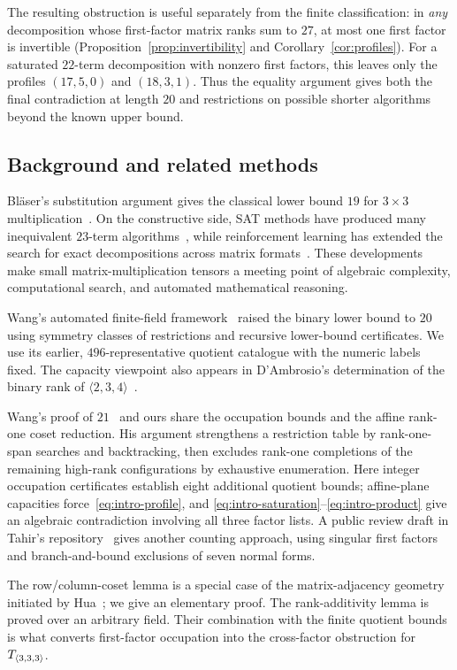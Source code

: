 The resulting obstruction is useful separately from the finite
classification: in \emph{any} decomposition whose first-factor matrix
ranks sum to $27$, at most one first factor is invertible
(Proposition~\ref{prop:invertibility} and
Corollary~\ref{cor:profiles}). For a saturated $22$-term
decomposition with nonzero first factors, this leaves only the profiles
$(17,5,0)$ and $(18,3,1)$. Thus the equality argument gives both the
final contradiction at length $20$ and restrictions on possible shorter
algorithms beyond the known upper bound.

\subsection{Background and related methods}
Bl\"aser's substitution argument gives the classical lower bound
$19$ for $3\times3$ multiplication~\cite{blaser}.
On the constructive side, SAT methods have produced many inequivalent
$23$-term algorithms~\cite{heule}, while reinforcement learning has
extended the search for exact decompositions across matrix
formats~\cite{alphatensor}. These developments make small
matrix-multiplication tensors a meeting point of algebraic complexity,
computational search, and automated mathematical reasoning.

Wang's automated finite-field framework~\cite{wang20} raised the
binary lower bound to $20$ using symmetry classes of restrictions and
recursive lower-bound certificates. We use its earlier,
$496$-representative quotient catalogue with the numeric labels fixed.
The capacity viewpoint also appears in D'Ambrosio's determination of
the binary rank of $\langle2,3,4\rangle$~\cite{dambrosio}.

Wang's proof of $21$~\cite{wang21} and ours share the occupation
bounds and the affine rank-one coset reduction. His argument
strengthens a restriction table by rank-one-span searches and
backtracking, then excludes rank-one completions of the remaining
high-rank configurations by exhaustive enumeration. Here integer
occupation certificates establish eight additional quotient bounds;
affine-plane capacities force~\eqref{eq:intro-profile}, and
\eqref{eq:intro-saturation}--\eqref{eq:intro-product} give an algebraic
contradiction involving all three factor lists.
A public review draft in Tahir's repository~\cite{tahir} gives another
counting approach, using singular first factors and
branch-and-bound exclusions of seven normal forms.

The row/column-coset lemma is a special case of the matrix-adjacency
geometry initiated by Hua~\cite{hua}; we give an elementary proof.
The rank-additivity lemma is proved over an arbitrary field.
Their combination with the finite quotient bounds is what converts
first-factor occupation into the cross-factor obstruction for $T_{\langle3,3,3\rangle}$.

